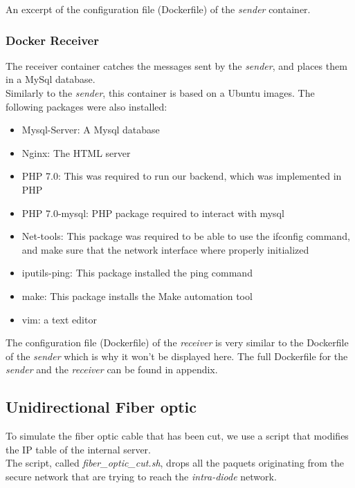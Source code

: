 \documentclass[a4paper,11pt]{article}
\begin{document}
\begin{table}

\caption{An excerpt of the configuration file (Dockerfile) of the \textit{sender} container.}
\end{table}

\subsubsection{Docker Receiver}
The receiver container catches the messages sent by the \textit{sender}, and places them in a MySql database.\\

Similarly to the \textit{sender}, this container is based on a Ubuntu images. The following packages were also installed:

\begin{itemize}
	\item{Mysql-Server: A Mysql database}
	\item{Nginx: The HTML server}
	\item{PHP 7.0: This was required to run our backend, which was implemented in PHP}
	\item{PHP 7.0-mysql: PHP package required to interact with mysql}
	\item{Net-tools: This package was required to be able to use the ifconfig command, and make sure that the network interface where properly initialized}
	\item{iputils-ping: This package installed the ping command}
	\item{make: This package installs the Make automation tool}
	\item{vim: a text editor}
\end{itemize}

The configuration file (Dockerfile) of the \textit{receiver} is very similar to the Dockerfile of the \textit{sender} which is why it won't be displayed here. The full Dockerfile for the \textit{sender} and the \textit{receiver} can be found in appendix.

\subsection{Unidirectional Fiber optic}
To simulate the fiber optic cable that has been cut, we use a script that modifies the IP table of the internal server.\\

The script, called \textit{fiber\_optic\_cut.sh}, drops all the paquets originating from the secure network that are trying to reach the \textit{intra-diode} network.
\end{document}
